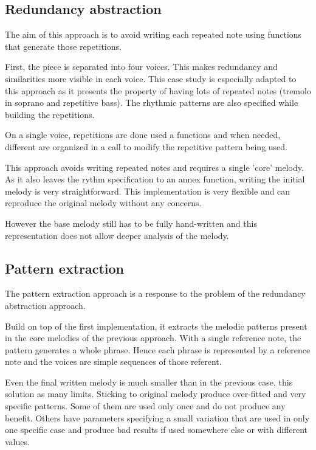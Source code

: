 \documentclass[twocolumn, 11pt]{article}
\begin{document}
\subsection{Redundancy abstraction}

The aim of this approach is to avoid writing each repeated note using functions that generate those repetitions.

First, the piece is separated into four voices. This makes redundancy and similarities more visible in each voice. This case study is especially adapted to this approach as it presents the property of having lots of repeated notes (tremolo in soprano and repetitive bass).
The rhythmic patterns are also specified while building the repetitions.

On a single voice, repetitions are done used a  functions and when needed, different  are organized in a  call to modify the repetitive pattern being used.

This approach avoids writing repeated notes and requires a single 'core' melody. As it also leaves the rythm specification to an annex function, writing the initial melody is very straightforward.
This implementation is very flexible and can reproduce the original melody without any concerns.

However the base melody still has to be fully hand-written and this representation does not allow deeper analysis of the melody.

\subsection{Pattern extraction}

The pattern extraction approach is a response to the problem of the redundancy abstraction approach.

Build on top of the first implementation, it extracts the melodic patterns present in the core melodies of the previous approach. With a single reference note, the pattern generates a whole phrase. Hence each phrase is represented by a reference note and the voices are simple sequences of those referent.


Even the final written melody is much smaller than in the previous case, this solution as many limits.
Sticking to original melody produce over-fitted and very specific patterns. Some of them are used only once and do not produce any benefit. Others have parameters specifying a small variation that are used in only one specific case and produce bad results if used somewhere else or with different values.
\end{document}
